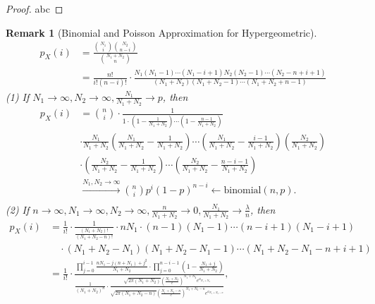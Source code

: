 \documentclass[openany,12pt]{book}
\newtheorem{remark}{Remark}[chapter]
\begin{document}
\begin{proof}
  abc
\end{proof}

\begin{remark}[Binomial and Poisson Approximation for Hypergeometric]
  $$
    \begin{aligned}
      p_X(i) & =\frac{\binom{N_1}{i}\binom{N_2}{n-i}}{\binom{N_1+N_2}{n}}                                                                                                                                      \\
             & =\frac{n!}{i!\left(n-i\right)!}\cdot\frac{N_1\left(N_1-1\right)\cdots\left(N_1-i+1\right)N_2\left(N_2-1\right)\cdots(N_2-n+i+1)}{\left(N_1+N_2\right)\left(N_1+N_2-1\right)\cdots(N_1+N_2+n-1)}
    \end{aligned}
  $$
  (1) If $N_1\to\infty, N_2\to\infty, \frac{N_1}{N_1+N_2}\to p$, then
  $$\begin{aligned}
    p_X(i) 
    & =\binom{n}{i}\cdot\frac{1}{1\cdot\left(1-\frac{1}{N_1+N_2}\right)\cdots\left(1-\frac{n-1}{N_1+N_2}\right)} \\
    & \cdot\frac{N_1}{N_1+N_2}\left(\frac{N_1}{N_1+N_2}-\frac{1}{N_1+N_2}\right)\cdots\left(\frac{N_1}{N_1+N_2}-\frac{i-1}{N_1+N_2}\right)\left(\frac{N_2}{N_1+N_2}\right) \\
    & \cdot\left(\frac{N_2}{N_1+N_2}-\frac{1}{N_1+N_2}\right)\cdots\left(\frac{N_2}{N_1+N_2}-\frac{n-i-1}{N_1+N_2}\right) \\
    & \xrightarrow{N_1, N_2\to\infty}\binom{n}{i}p^i(1-p)^{n-i}\leftarrow\mathrm{binomial}(n,p). \\
    \end{aligned}
  $$
  (2) If $n\to\infty, N_1\to\infty, N_2\to\infty, \frac{n}{N_1+N_2}\to0, \frac{N_1}{N_1+N_2}\to\frac{\lambda}{n}$, then
  $$\begin{aligned}
      p_X(i) 
      & =\frac{1}{i!}\cdot\frac{1}{\frac{\left(N_1+N_2\right)!}{\left(N_1+N_2-n\right)!}}\cdot nN_1\cdot\left(n-1\right)\left(N_1-1\right)\cdots\left(n-i+1\right)\left(N_1-i+1\right) \\
      &\quad \cdot(N_1+N_2-N_1)(N_1+N_2-N_1-1)\cdots(N_1+N_2-N_1-n+i+1) \\
      & =\frac{1}{i!}\cdot\frac{\prod_{j=0}^{i-1}{\frac{nN_1-j\left(n+N_1\right)+j^2}{N_1+N_2}\cdot\prod_{j=0}^{n-i-1}\left(1-\frac{N_1+j}{N_1+N_2}\right)}}{\frac{1}{(N_1+N_2)^n}\cdot\frac{\sqrt{2\pi\left(N_1+N_2\right)}\left(\frac{N_1+N_2}{e}\right)^{N_1+N_2}e^{a_{N_1+N_2}}}{\sqrt{2\pi\left(N_1+N_2-n\right)}\left(\frac{N_1+N_2-n}{e}\right)^{N_1+N_2-n}e^{a_{N_1+N_2-n}}}}, \\

\end{aligned}$$
\end{remark}
\end{document}
